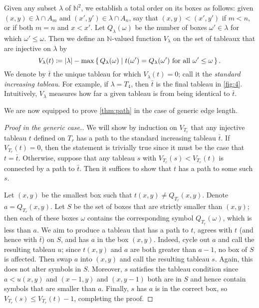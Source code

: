 \documentclass[11pt,reqno]{amsart}
\newcommand*{\N}{\mathbb{N}}
\newcommand*{\abs}[1]{{\lvert #1 \rvert}}
\newcommand*{\given}{\mid}
\newcommand*{\maps}{\nobreak\mskip2mu\mathpunct{}\nonscript
  \mkern-\thinmuskip{:}\mskip6muplus1mu\relax}
\newcommand*{\card}[1]{\abs{#1}}
\newcommand{\caelan}[1]{\textcolor{orange}{\sf C: [#1]}}
\theoremstyle{definition}
\theoremstyle{problem}
\theoremstyle{plain}
\theoremstyle{remark}
\theoremstyle{theorem}
\numberwithin{equation}{section}
\numberwithin{figure}{section}
\begin{document}
Given any subset $\lambda$ of $\N^2$, we establish a total order on
its boxes as follows: given $(x,y) \in \lambda \cap A_m$ and
$(x',y') \in \lambda \cap A_n$, say that $(x,y) < (x',y')$  if
$m < n$, or if both $m = n$ and $x < x'$.  Let
 $Q_{\lambda}(\omega)$
be the number of boxes $\omega' \in \lambda$ for which
$\omega' \leq \omega$.
%
Then we define an $\N$-valued function $V_{\lambda}$ on the set of
tableaux that are injective on $\lambda$ by
\begin{equation*}
  V_{\lambda}(t) \coloneq \card{\lambda} - \max \set{Q_{\lambda}(\omega)
    \given t(\omega') = Q_{\lambda}(\omega') \text{ for all }
    \omega' \leq \omega}.
\end{equation*}
We denote by $\bar{t}$ the unique tableau for which
$V_{\lambda}(t) = 0$; call it the \textit{standard increasing
  tableau}.  For example, if $\lambda = T_4$, then $\bar{t}$ is the
final tableau in \cref{fig:4}.  Intuitively, $V_{\lambda}$ measures
how far a given tableau is from being identical to $\bar{t}$.

We are now equipped to prove \cref{thm:path} in the case of generic
edge length.

\begin{proof}[Proof in the generic case.]
  We will show by induction on $V_{T_r}$ that any injective tableau
  $t$ defined on $T_r$ has a path to the standard increasing tableau
  $\bar{t}$.  If $V_{T_r}(t) = 0$, then the statement is trivially
  true since it must be the case that $t = \bar{t}$.  Otherwise,
  suppose that any tableau $s$ with $V_{T_r}(s) < V_{T_r}(t)$ is
  connected by a path to $\bar{t}$.  Then it suffices to show that $t$
  has a path to some such $s$.
  
  Let $(x,y)$ be the smallest box such that
  $t(x,y) \neq Q_{T_r}(x,y)$.  Denote $a =Q_{T_r}(x,y)$.  Let $S$ be
  the set of boxes that are strictly smaller than $(x,y)$; then each
  of these boxes $\omega$ contains the corresponding symbol
  $Q_{T_r}(\omega)$, which is less than $a$.  We aim to produce a
  tableau that has a path  to $t$, agrees with $t$ (and hence
  with $\bar{t}$) on $S$, and has $a$ in the box $(x,y)$.  Indeed,
  cycle out $a$ and call the resulting tableau $u$; since $t(x,y)$ and
  $a$ are both greater than $a - 1$, no box of $S$ is affected.  Then
  swap $a$ into $(x,y)$ and call the resulting tableau $s$.  Again,
  this does not alter symbols in $S$.  Moreover, $s$ satisfies the
  tableau condition since $a < u(x,y)$ and $(x-1,y)$ and $(x,y-1)$
  both are in $S$ and hence contain symbols that are smaller than $a$.
  Finally, $s$ has $a$ is in the correct box, so
  $V_{T_r}(s) \leq V_{T_r}(t) - 1$, completing the proof.
\end{proof}
\end{document}
